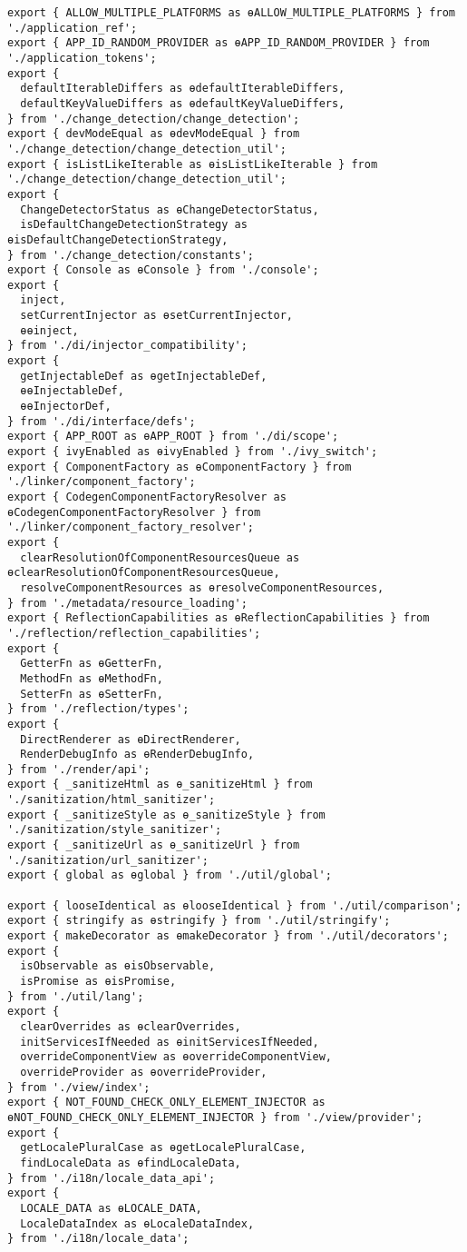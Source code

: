\begin{verbatim}
export { ALLOW_MULTIPLE_PLATFORMS as ɵALLOW_MULTIPLE_PLATFORMS } from './application_ref';
export { APP_ID_RANDOM_PROVIDER as ɵAPP_ID_RANDOM_PROVIDER } from './application_tokens';
export {
  defaultIterableDiffers as ɵdefaultIterableDiffers,
  defaultKeyValueDiffers as ɵdefaultKeyValueDiffers,
} from './change_detection/change_detection';
export { devModeEqual as ɵdevModeEqual } from './change_detection/change_detection_util';
export { isListLikeIterable as ɵisListLikeIterable } from './change_detection/change_detection_util';
export {
  ChangeDetectorStatus as ɵChangeDetectorStatus,
  isDefaultChangeDetectionStrategy as ɵisDefaultChangeDetectionStrategy,
} from './change_detection/constants';
export { Console as ɵConsole } from './console';
export {
  inject,
  setCurrentInjector as ɵsetCurrentInjector,
  ɵɵinject,
} from './di/injector_compatibility';
export {
  getInjectableDef as ɵgetInjectableDef,
  ɵɵInjectableDef,
  ɵɵInjectorDef,
} from './di/interface/defs';
export { APP_ROOT as ɵAPP_ROOT } from './di/scope';
export { ivyEnabled as ɵivyEnabled } from './ivy_switch';
export { ComponentFactory as ɵComponentFactory } from './linker/component_factory';
export { CodegenComponentFactoryResolver as ɵCodegenComponentFactoryResolver } from './linker/component_factory_resolver';
export {
  clearResolutionOfComponentResourcesQueue as ɵclearResolutionOfComponentResourcesQueue,
  resolveComponentResources as ɵresolveComponentResources,
} from './metadata/resource_loading';
export { ReflectionCapabilities as ɵReflectionCapabilities } from './reflection/reflection_capabilities';
export {
  GetterFn as ɵGetterFn,
  MethodFn as ɵMethodFn,
  SetterFn as ɵSetterFn,
} from './reflection/types';
export {
  DirectRenderer as ɵDirectRenderer,
  RenderDebugInfo as ɵRenderDebugInfo,
} from './render/api';
export { _sanitizeHtml as ɵ_sanitizeHtml } from './sanitization/html_sanitizer';
export { _sanitizeStyle as ɵ_sanitizeStyle } from './sanitization/style_sanitizer';
export { _sanitizeUrl as ɵ_sanitizeUrl } from './sanitization/url_sanitizer';
export { global as ɵglobal } from './util/global';

export { looseIdentical as ɵlooseIdentical } from './util/comparison';
export { stringify as ɵstringify } from './util/stringify';
export { makeDecorator as ɵmakeDecorator } from './util/decorators';
export {
  isObservable as ɵisObservable,
  isPromise as ɵisPromise,
} from './util/lang';
export {
  clearOverrides as ɵclearOverrides,
  initServicesIfNeeded as ɵinitServicesIfNeeded,
  overrideComponentView as ɵoverrideComponentView,
  overrideProvider as ɵoverrideProvider,
} from './view/index';
export { NOT_FOUND_CHECK_ONLY_ELEMENT_INJECTOR as ɵNOT_FOUND_CHECK_ONLY_ELEMENT_INJECTOR } from './view/provider';
export {
  getLocalePluralCase as ɵgetLocalePluralCase,
  findLocaleData as ɵfindLocaleData,
} from './i18n/locale_data_api';
export {
  LOCALE_DATA as ɵLOCALE_DATA,
  LocaleDataIndex as ɵLocaleDataIndex,
} from './i18n/locale_data';
\end{verbatim}
